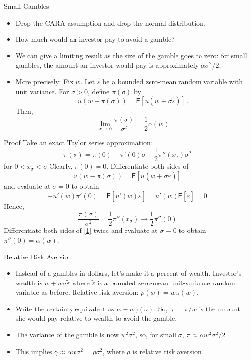 \documentclass[10pt]{beamer}
\newcommand{\bi}{\begin{itemize}}
\newcommand{\ei}{\end{itemize}}
\newcommand{\im}{\item}
\newcommand{\E}{\mathrm{e}}
\newcommand{\mye}{\ensuremath{\mathsf{E}}}
\newcommand{\bq}{\begin{equation}}
\newcommand{\eq}{\end{equation}}
\newcommand{\tve}{\tilde{\varepsilon}}
\begin{document}

\begin{frame}{Small Gambles}
\bi
\im Drop the CARA assumption and drop the normal distribution.\im How much would an investor pay to avoid a gamble?
\im We can give a limiting result as the size of the gamble goes to zero:  for small gambles, the amount an investor would pay is approximately $\alpha\sigma^2/2$.
\im More precisely:  Fix $w$.  Let $\tve$ be a bounded zero-mean random variable with unit variance.  For $\sigma>0$, define $\pi(\sigma)$ by 
$$u(w - \pi(\sigma)) = \mye[u(w+\sigma\tve)]\,.$$
Then,
$$\lim_{\sigma \rightarrow 0} \frac{\pi(\sigma)}{\sigma^2} = \frac{1}{2}\alpha(w)$$
\ei
\end{frame}

\begin{frame}{Proof}
Take an exact Taylor series approximation:
$$\pi(\sigma)= \pi(0) + \pi'(0)\sigma + \frac{1}{2}\pi''(x_\sigma)\sigma^2$$
for $0<x_\sigma<\sigma$
Clearly, $\pi(0)=0$.  Differentiate both sides of 
\bq\tag{$\star$}\label{1}
u(w - \pi(\sigma)) = \mye[u(w+\sigma\tve)]
\eq
and evaluate at $\sigma=0$ to obtain
$$-u'(w)\pi'(0) = \mye[u'(w)\tve] = u'(w)\mye[\tve] = 0$$
Hence,
$$\frac{\pi(\sigma)}{\sigma^2} = \frac{1}{2}\pi''(x_\sigma) \rightarrow \frac{1}{2}\pi''(0)$$
Differentiate both sides of \eqref{1}
twice and evaluate at $\sigma=0$ to obtain $\pi''(0) = \alpha(w)$.
\end{frame}

\begin{frame}{Relative Risk Aversion}
\bi
\im Instead of a gambles in dollars, let's make it a percent of wealth.  Investor's wealth is $w + w\sigma\tve$ where $\tve$ is a bounded zero-mean unit-variance random variable as before.  Relative risk aversion: $\rho(w) = w\alpha(w)$.
\im Write the certainty equivalent as $w-w\gamma(\sigma)$.  So, $\gamma := \pi/w$ is the amount she would pay \alert{relative to wealth} to avoid the gamble.
\im The variance of the gamble is now $w^2\sigma^2$, so, for small $\sigma$, $\pi \approx \alpha w^2\sigma^2/2$.
\im This implies $\gamma \approx \alpha w \sigma^2 = \rho \sigma^2$, where $\rho$ is \alert{relative risk aversion}..

\ei
\end{frame}
\end{document}
